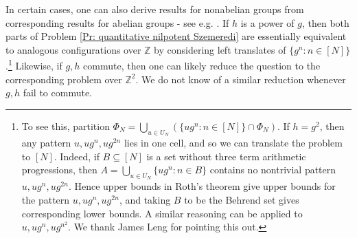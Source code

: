 \documentclass[11pt]{amsart}
\theoremstyle{definition}
\newcommand{\Z}{{\mathbb Z}}
\newcommand{\1}{{\mathbf{1}}}
\begin{document}
{In certain cases, one can also derive results for nonabelian groups from corresponding results for abelian groups - see e.g. \cite[Corollaries 1.4-1.6]{JLLOS25}. If $h$ is a power of $g$, then both parts of Problem \ref{Pr: quantitative nilpotent Szemeredi} are essentially equivalent to analogous configurations over $\Z$ by considering left translates of $\{g^n\colon n\in[N]\}$.\footnote{To see this, partition $\Phi_N = \bigcup\limits_{u\in U_N}(\{ug^n\colon n\in[N]\}\cap\Phi_N)$. If $h=g^2$, then any pattern $u, ug^n, ug^{2n}$ lies in one cell, and so we can translate the problem to $[N]$. Indeed, if $B\subseteq [N]$ is a set without three term arithmetic progressions, then $A = \bigcup\limits_{u\in U_N}\{ug^n\colon n\in B\}$ contains no nontrivial pattern $u, ug^n, ug^{2n}$. Hence upper bounds in Roth's theorem give upper bounds for the pattern $u, ug^n, ug^{2n}$, and taking $B$ to be the Behrend set gives corresponding lower bounds. A similar reasoning can be applied to $u, ug^n, ug^{n^2}$. We thank James Leng for pointing this out.} Likewise, if $g,h$ commute, then one can likely reduce the question to the corresponding problem over $\Z^2$. We do not know of a similar reduction whenever $g,h$ fail to commute.}
\end{document}
